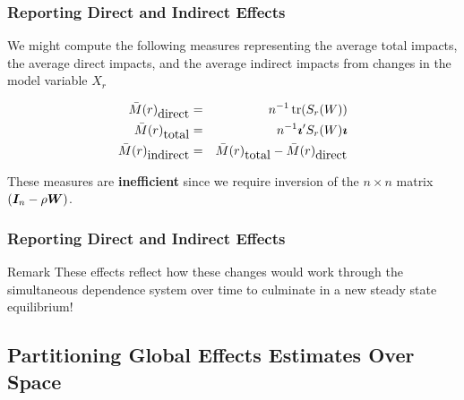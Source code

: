 \documentclass[english,10pt]{beamer}\usepackage[]{graphicx}\usepackage[]{xcolor}
\begin{document}
\begin{frame}
    \frametitle{Reporting Direct and Indirect Effects}
We might compute the following measures representing the average total impacts, the average direct impacts, and the average indirect impacts from changes in the model variable $X_r$
        
        \begin{eqnarray*}
          \bar{M}(r)_{\mbox{direct}} &=& n^{-1}\operatorname{tr}(S_r(W)) \\
          \bar{M}(r)_{\mbox{total}}  &=& n^{-1}\bm\imath'S_r(W)\bm\imath \\
          \bar{M}(r)_{\mbox{indirect}} &=& \bar{M}(r)_{\mbox{total}}  - \bar{M}(r)_{\mbox{direct}} 
        \end{eqnarray*}
        
These measures are \textbf{inefficient} since we require inversion of the $n\times n$ matrix $(\bm I_n - \rho \bm W)$.
\end{frame}

\begin{frame}
    \frametitle{Reporting Direct and Indirect Effects}
      \alert{Remark} These effects reflect how these changes would work through the simultaneous dependence system over time to culminate in a new steady state equilibrium!
\end{frame}

\subsection{Partitioning Global Effects Estimates Over Space}
\end{document}
